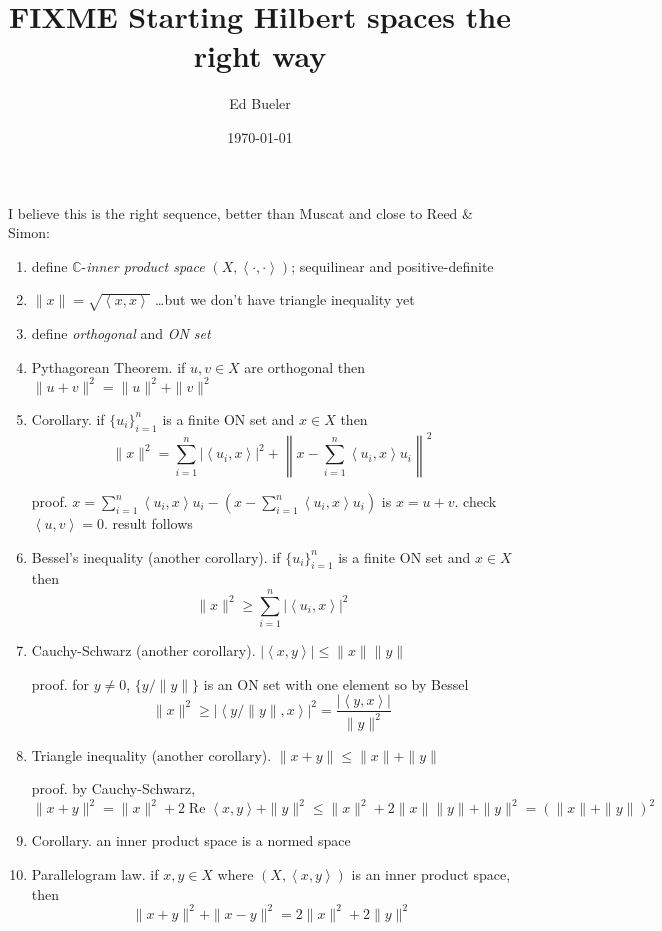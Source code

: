 \documentclass[11pt]{article}
\title{FIXME  Starting Hilbert spaces the right way}
\author{Ed Bueler}
\date{\today}
\newcommand{\CC}{\mathbb{C}}
\newcommand{\ip}[2]{\ensuremath{\left<#1,#2\right>}}
\begin{document}
\maketitle

I believe this is the right sequence, better than Muscat and close to Reed \& Simon:
\begin{enumerate}
\item define $\CC$-\emph{inner product space} $(X,\ip{\cdot}{\cdot})$; sequilinear and positive-definite

\item $\|x\|=\sqrt{\ip{x}{x}}$ \dots but we don't have triangle inequality yet

\item define \emph{orthogonal} and \emph{ON set}

\item Pythagorean Theorem. if $u,v\in X$ are orthogonal then $\|u+v\|^2 = \|u\|^2 + \|v\|^2$

\item Corollary. if $\{u_i\}_{i=1}^n$ is a finite ON set and $x\in X$ then
    $$\|x\|^2 = \sum_{i=1}^n |\ip{u_i}{x}|^2 + \left\|x - \sum_{i=1}^n \ip{u_i}{x} u_i\right\|^2$$

proof. $x = \sum_{i=1}^n \ip{u_i}{x} u_i - \left(x - \sum_{i=1}^n \ip{u_i}{x} u_i\right)$ is $x=u+v$.  check $\ip{u}{v}=0$. result follows

\item Bessel's inequality (another corollary). if $\{u_i\}_{i=1}^n$ is a finite ON set and $x\in X$ then
    $$\|x\|^2 \ge \sum_{i=1}^n |\ip{u_i}{x}|^2$$

\item Cauchy-Schwarz (another corollary). $|\ip{x}{y}| \le \|x\|\|y\|$

proof. for $y\ne 0$, $\{y/\|y\|\}$ is an ON set with one element so by Bessel
    $$\|x\|^2 \ge |\ip{y/\|y\|}{x}|^2 = \frac{|\ip{y}{x}|}{\|y\|^2}$$

\item Triangle inequality (another corollary). $\|x+y\| \le \|x\|+\|y\|$

proof. by Cauchy-Schwarz,
   $$\|x+y\|^2 = \|x\|^2 + 2 \operatorname{Re}\ip{x}{y} + \|y\|^2 \le \|x\|^2 + 2 \|x\|\|y\| + \|y\|^2 = \left(\|x\|+\|y\|\right)^2$$

\item Corollary. an inner product space is a normed space

\item Parallelogram law. if $x,y\in X$ where $(X,\ip{x}{y})$ is an inner product space, then
    $$\|x+y\|^2 + \|x-y\|^2 = 2 \|x\|^2 + 2 \|y\|^2$$


\end{enumerate}
\end{document}
